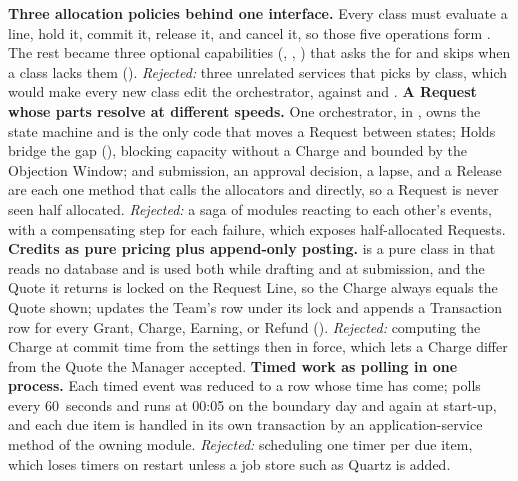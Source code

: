 \textbf{Three allocation policies behind one interface.} Every class must evaluate a line, hold it, commit it, release it, and cancel it, so those five operations form . The rest became three optional capabilities (, , ) that  asks the  for and skips when a class lacks them (). \emph{Rejected:} three unrelated services that  picks by class, which would make every new class edit the orchestrator, against  and . \textbf{A Request whose parts resolve at different speeds.} One orchestrator,  in , owns the state machine and is the only code that moves a Request between states; Holds bridge the gap (), blocking capacity without a Charge and bounded by the Objection Window; and submission, an approval decision, a lapse, and a Release are each one  method that calls the allocators and  directly, so a Request is never seen half allocated. \emph{Rejected:} a saga of modules reacting to each other's events, with a compensating step for each failure, which exposes half-allocated Requests. \textbf{Credits as pure pricing plus append-only posting.}  is a pure class in  that reads no database and is used both while drafting and at submission, and the Quote it returns is locked on the Request Line, so the Charge always equals the Quote shown;  updates the Team's  row under its lock and appends a Transaction row for every Grant, Charge, Earning, or Refund (). \emph{Rejected:} computing the Charge at commit time from the settings then in force, which lets a Charge differ from the Quote the Manager accepted. \textbf{Timed work as polling in one process.} Each timed event was reduced to a row whose time has come;  polls every 60~seconds and  runs at 00:05 on the boundary day and again at start-up, and each due item is handled in its own transaction by an application-service method of the owning module. \emph{Rejected:} scheduling one timer per due item, which loses timers on restart unless a job store such as Quartz is added.
